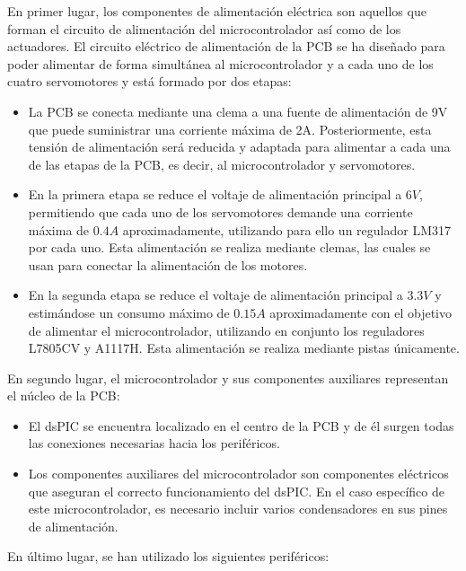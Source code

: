 En primer lugar, los componentes de alimentación eléctrica son aquellos que forman el circuito de alimentación del microcontrolador así como de los actuadores. El circuito eléctrico de alimentación de la \ac{PCB} se ha diseñado para poder alimentar de forma simultánea al microcontrolador y a cada uno de los cuatro servomotores y está formado por dos etapas:
\begin{itemize}
    \item La \ac{PCB} se conecta mediante una clema a una fuente de alimentación de 9V que puede suministrar una corriente máxima de 2A. Posteriormente, esta tensión de alimentación será reducida y adaptada para alimentar a cada una de las etapas de la \ac{PCB}, es decir, al microcontrolador y servomotores.
    
    \item En la primera etapa se reduce el voltaje de alimentación principal a $6V$, permitiendo que cada uno de los servomotores demande una corriente máxima de $0.4A$ aproximadamente, utilizando para ello un regulador LM317 por cada uno. Esta alimentación se realiza mediante clemas, las cuales se usan para conectar la alimentación de los motores.
    
    \item En la segunda etapa se reduce el voltaje de alimentación principal a $3.3V$ y estimándose un consumo máximo de $0.15A$ aproximadamente con el objetivo de alimentar el microcontrolador, utilizando en conjunto los reguladores L7805CV y A1117H. Esta alimentación se realiza mediante pistas únicamente.
\end{itemize}

En segundo lugar, el microcontrolador y sus componentes auxiliares representan el núcleo de la \ac{PCB}:
\begin{itemize}
    \item El dsPIC se encuentra localizado en el centro de la \ac{PCB} y de él surgen todas las conexiones necesarias hacia los periféricos.
    \item Los componentes auxiliares del microcontrolador son componentes eléctricos que aseguran el correcto funcionamiento del dsPIC. En el caso específico de este microcontrolador, es necesario incluir varios condensadores en sus pines de alimentación.
\end{itemize}

En último lugar, se han utilizado los siguientes periféricos:

